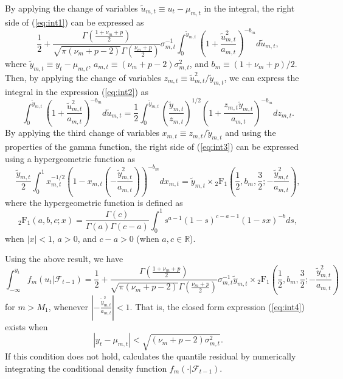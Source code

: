 \documentclass[nojss]{jss} %
\begin{document}
\begin{appendix}
By applying the change of variables $\tilde{u}_{m,t}\equiv u_t - \mu_{m,t}$ in the integral, the right side of (\ref{eq:int1}) can be expressed as
%
\begin{equation}\label{eq:int2}
\frac{1}{2} + \frac{\Gamma\left(\frac{1 + \nu_m + p}{2}\right)}{\sqrt{\pi(\nu_m + p - 2)}\Gamma\left(\frac{\nu_m + p}{2}\right)}\sigma_{m,t}^{-1} \int_{0}^{\tilde{y}_{m,t}}\left(1 + \frac{\tilde{u}_{m,t}^2}{a_{m,t}} \right)^{-b_m} d \tilde{u}_{m,t},
\end{equation}
%
where $\tilde{y}_{m,t} \equiv y_t - \mu_{m,t}$, $a_{m,t}\equiv (\nu_m + p - 2)\sigma_{m,t}^2$, and $b_{m}\equiv (1 + \nu_m + p)/2$. Then, by applying the change of variables $z_{m,t}\equiv \tilde{u}_{m,t}^2/\tilde{y}_{m,t}$, we can express the integral in the expression (\ref{eq:int2}) as
%
\begin{equation}\label{eq:int3}
\int_{0}^{\tilde{y}_{m,t}}\left(1 + \frac{\tilde{u}_{m,t}^2}{a_{m,t}} \right)^{-b_m} d \tilde{u}_{m,t} = \frac{1}{2} \int_{0}^{\tilde{y}_{m,t}} \left(\frac{\tilde{y}_{m,t}}{z_{m,t}}\right)^{1/2}\left(1 + \frac{z_{m,t}\tilde{y}_{m,t}}{a_{m,t}}\right)^{-b_m}d z_{m,t}.
\end{equation}
%
By applying the third change of variables $x_{m,t}\equiv z_{m,t}/\tilde{y}_{m,t}$ and using the properties of the gamma function, the right side of (\ref{eq:int3}) can be expressed using a hypergeometric function as
%
\begin{equation}
\frac{\tilde{y}_{m,t}}{2}\int_{0}^{1}x_{m,t}^{-1/2}\left(1-x_{m,t}\left(-\frac{\tilde{y}_{m,t}^2}{a_{m,t}} \right) \right)^{-b_{m}} dx_{m,t}=\tilde{y}_{m,t} \times {}_2\text{F}_1\left(\frac{1}{2},b_{m},\frac{3}{2};-\frac{\tilde{y}_{m,t}^2}{a_{m,t}} \right),
\end{equation}
%
where the hypergeometric function is defined as \citep[Section 1.3.1]{Aomoto+Kita:2011}
\begin{equation}
{}_2\text{F}_1\left(a,b,c;x \right) = \frac{\Gamma(c)}{\Gamma(a)\Gamma(c-a)}\int_{0}^{1}s^{a-1}(1-s)^{c-a-1}(1-sx)^{-b} ds,
\end{equation}
when $|x|<1$, $a>0$, and $c-a>0$ (when $a,c\in\mathbb{R}$).

Using the above result, we have
\begin{equation}\label{eq:int4}
\int_{-\infty}^{y_t} f_m(u_t|\mathcal{F}_{t-1}) = \frac{1}{2} + \frac{\Gamma\left(\frac{1 + \nu_m + p}{2}\right)}{\sqrt{\pi(\nu_m + p - 2)}\Gamma\left(\frac{\nu_m + p}{2}\right)}\sigma_{m,t}^{-1} \tilde{y}_{m,t} \times {}_2\text{F}_1\left(\frac{1}{2},b_{m},\frac{3}{2};-\frac{\tilde{y}_{m,t}^2}{a_{m,t}}\right)
\end{equation}
for $m>M_1$, whenever $\left|-\frac{\tilde{y}_{m,t}^2}{a_{m,t}}\right|<1$. That is, the closed form expression (\ref{eq:int4}) exists when
\begin{equation}\label{eq:qrescond}
|y_t - \mu_{m,t}| < \sqrt{(\nu_m + p - 2)\sigma_{m,t}^2}.
\end{equation}
If this condition does not hold,  calculates the quantile residual by numerically integrating the conditional density function $f_m(\cdot|\mathcal{F}_{t-1})$.
\end{appendix}
\end{document}
